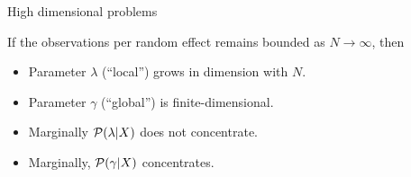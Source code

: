 \begin{frame}{High dimensional problems}

    If the observations per random effect remains bounded as $N \rightarrow
    \infty$, then
    \begin{itemize}
    \item Parameter $\lambda$ (``local'') grows in dimension with $N$.
    \item Parameter $\gamma$ (``global'') is finite-dimensional.
    \item Marginally $\mathcal{P}(\lambda \vert X)$ does not concentrate.
    \item Marginally, $\mathcal{P}(\gamma \vert X)$ concentrates.
    \end{itemize}
    

\spskip
\pause
{}

%
\end{frame}





